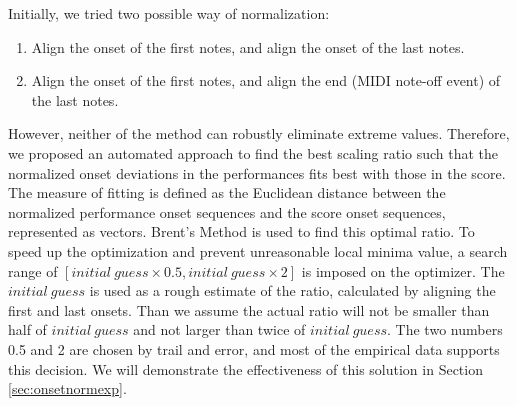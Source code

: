 
   Initially, we tried two possible way of normalization: 
   \begin{enumerate}
      \item Align the onset of the first notes, and align the onset of the last notes.
      \item Align the onset of the first notes, and align the end (MIDI note-off event) of the last notes.
   \end{enumerate}
   However, neither of the method can robustly eliminate extreme values.  Therefore, we proposed an automated approach to find the best scaling ratio such that the normalized onset deviations in the performances fits best with those in the score. The measure of fitting is defined as the Euclidean distance between the normalized performance onset sequences and the score onset sequences, represented as vectors. %
 Brent's Method \cite{brent1973} is used to find this optimal ratio. To speed up the optimization and prevent unreasonable local minima value, a search range of $[initial\ guess \times 0.5 , initial\ guess \times 2]$ is imposed on the optimizer. The $initial\ guess$ is used as a rough estimate of the ratio, calculated by aligning the first and last onsets. Than we assume the actual ratio will not be smaller than half of $initial\ guess$ and not larger than twice of $initial\ guess$. The two numbers 0.5 and 2 are chosen by trail and error, and most of the empirical data supports this decision. We will demonstrate the effectiveness of this solution in Section \ref{sec:onsetnormexp}.

